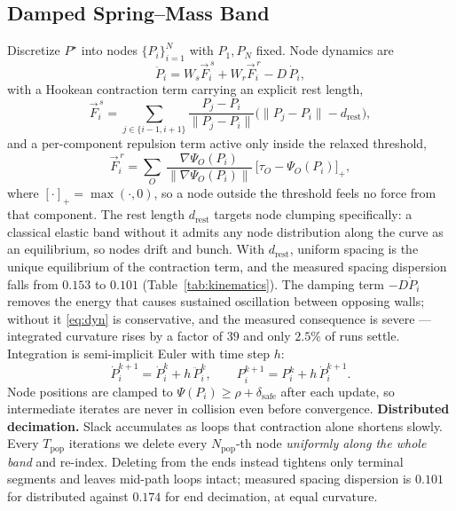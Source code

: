 \documentclass[conference]{IEEEtran}
\begin{document}
\subsection{Damped Spring--Mass Band}
Discretize $P^\star$ into nodes $\{P_i\}_{i=1}^{N}$ with $P_1,P_N$ fixed. Node dynamics are
\begin{equation}
\ddot{P}_i = W_s \vec{F}^{\,s}_i + W_r \vec{F}^{\,r}_i - D\,\dot{P}_i ,
\label{eq:dyn}
\end{equation}
with a Hookean contraction term carrying an explicit rest length,
\begin{equation}
\vec{F}^{\,s}_i=\!\!\sum_{j\in\{i-1,i+1\}}\!\!\frac{P_j-P_i}{\|P_j-P_i\|}\Big(\|P_j-P_i\|-d_{\mathrm{rest}}\Big),
\end{equation}
and a per-component repulsion term active only inside the relaxed threshold,
\begin{equation}
\vec{F}^{\,r}_i=\sum_{O}\ \frac{\nabla\Psi_O(P_i)}{\|\nabla\Psi_O(P_i)\|}\ \big[\tau_O-\Psi_O(P_i)\big]_+ ,
\end{equation}
where $[\cdot]_+=\max(\cdot,0)$, so a node outside the threshold feels no force from that component.
The rest length $d_{\mathrm{rest}}$ targets node clumping specifically: a classical elastic band without it admits any node distribution along the curve as an equilibrium, so nodes drift and bunch. With $d_{\mathrm{rest}}$, uniform spacing is the unique equilibrium of the contraction term, and the measured spacing dispersion falls from $0.153$ to $0.101$ (Table~\ref{tab:kinematics}). The damping term $-D\dot{P}_i$ removes the energy that causes sustained oscillation between opposing walls; without it \eqref{eq:dyn} is conservative, and the measured consequence is severe --- integrated curvature rises by a factor of $39$ and only $2.5\%$ of runs settle.
Integration is semi-implicit Euler with time step $h$:
\begin{equation}
\dot{P}_i^{k+1}=\dot{P}_i^{k}+h\,\ddot{P}_i^{k},\qquad P_i^{k+1}=P_i^{k}+h\,\dot{P}_i^{k+1}.
\end{equation}
Node positions are clamped to $\Psi(P_i)\ge\rho+\delta_{\mathrm{safe}}$ after each update, so intermediate iterates are never in collision even before convergence.
\textbf{Distributed decimation.} Slack accumulates as loops that contraction alone shortens slowly. Every $T_{\mathrm{pop}}$ iterations we delete every $N_{\mathrm{pop}}$-th node \emph{uniformly along the whole band} and re-index. Deleting from the ends instead tightens only terminal segments and leaves mid-path loops intact; measured spacing dispersion is $0.101$ for distributed against $0.174$ for end decimation, at equal curvature.
\end{document}
